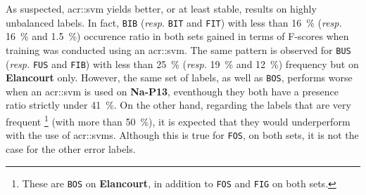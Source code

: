         As suspected, \gls{acr::svm} yields better, or at least stable, results on highly unbalanced labels.
        In fact, \texttt{BIB} (\textit{resp.} \texttt{BIT} and \texttt{FIT}) with less than \SI{16}{\percent} (\textit{resp.} \SI{16}{\percent} and \SI{1.5}{\percent}) occurence ratio in both sets gained in terms of F-scores when training was conducted using an \gls{acr::svm}.
        The same pattern is observed for \texttt{BUS} (\textit{resp.} \texttt{FUS} and \texttt{FIB}) with less than \SI{25}{\percent} (\textit{resp.} \SI{19}{\percent} and \SI{12}{\percent}) frequency but on \textbf{Elancourt} only.
        However, the same set of labels, as well as \texttt{BOS}, performs worse when an \gls{acr::svm} is used on \textbf{Na-P13}, eventhough they both have a presence ratio strictly under \SI{41}{\percent}.
        On the other hand, regarding the labels that are very frequent \footnote{
            These are \texttt{BOS} on \textbf{Elancourt}, in addition to \texttt{FOS} and \texttt{FIG} on both sets.
        } (with more than \SI{50}{\percent}), it is expected that they would underperform with the use of \glspl{acr::svm}.
        Although this is true for \texttt{FOS}, on both sets, it is not the case for the other error labels.\\

